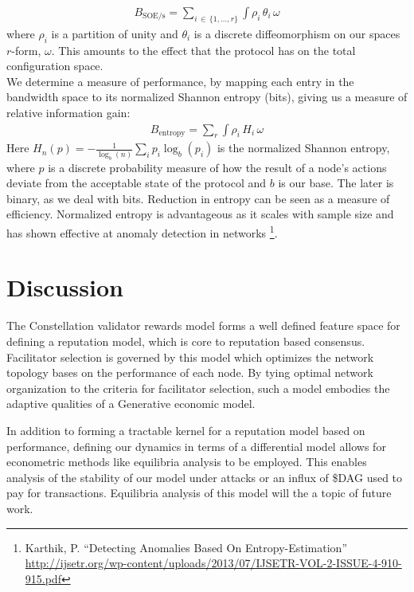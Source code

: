 \documentclass{article}
\begin{document}
\begin{equation*} \label{eq2}
\begin{split}
B_{\mathrm{SOE}/\mathrm{s}} = \sum_{i\,\in\,\{1, \dots, r\}} \int \rho_i\, \theta_i\, \omega
\end{split}
\end{equation*}
where $\rho_i$ is a partition of unity and $\theta_i$ is a discrete diffeomorphism on our spaces $r$-form, $\omega$. This amounts to the effect that the protocol has on the total configuration space.\\
We determine a measure of performance, by mapping each entry in the bandwidth space to its normalized Shannon entropy (bits), giving us a measure of relative information gain:
\begin{equation*} \label{eq3}
\begin{split}
B_\mathrm{entropy} = \sum_{r} \int \rho_i\, H_i\, \omega 
\end{split}
\end{equation*}
Here 
{$H_n(p) = - \tfrac{1}{\log_b(n)} \sum_i p_i \log_b(p_i)$}
is the normalized Shannon entropy, where $p$ is a discrete probability measure of how the result of a node's actions deviate from the acceptable state of the protocol and $b$ is our base. The later is binary, as we deal with bits. Reduction in entropy can be seen as a measure of efficiency. Normalized entropy is advantageous as it scales with sample size and has shown effective at anomaly detection in networks
\footnote{Karthik, P. ``Detecting Anomalies Based On Entropy-Estimation''\\ \url{http://ijsetr.org/wp-content/uploads/2013/07/IJSETR-VOL-2-ISSUE-4-910-915.pdf}}.

\section{Discussion}
The Constellation validator rewards model forms a well defined feature space for defining a reputation model, which is core to reputation based consensus. Facilitator selection is governed by this model which optimizes the network topology bases on the performance of each node. By tying optimal network organization to the criteria for facilitator selection, such a model embodies the adaptive qualities of a Generative economic model.

In addition to forming a tractable kernel for a reputation model based on performance, defining our dynamics in terms of a differential model allows for econometric methods like equilibria analysis to be employed. This enables analysis of the stability of our model under attacks or an influx of \$DAG used to pay for transactions. Equilibria analysis of this model will the a topic of future work.


\end{document}
